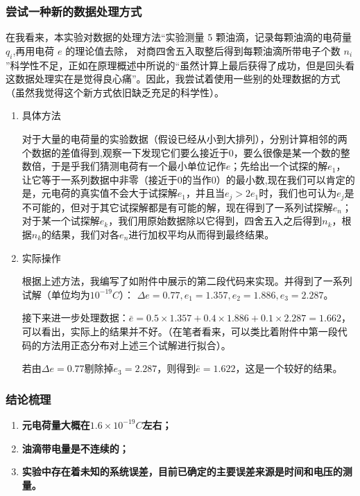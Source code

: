 \documentclass[dvipsnames, svgnames,a4paper,11pt]{article}
\begin{document}
	\subsubsection{尝试一种新的数据处理方式}
	在我看来，本实验对数据的处理方法“实验测量 5 颗油滴，记录每颗油滴的电荷量 $q_i$,再用电荷 $e$ 的理论值去除，
	对商四舍五入取整后得到每颗油滴所带电子个数 $n_i$”科学性不足，正如在原理概述中所说的“虽然计算上最后获得了成功，但是回头看这数据处理实在是觉得良心痛”。因此，我尝试着使用一些别的处理数据的方式（虽然我觉得这个新方式依旧缺乏充足的科学性）。
	\begin{enumerate}
		\item 具体方法
		
		对于大量的电荷量的实验数据（假设已经从小到大排列），分别计算相邻的两个数据的差值得到,观察一下发现它们要么接近于0，要么很像是某一个数的整数倍，于是乎我们猜测电荷有一个最小单位记作$e$；先给出一个试探的解$e_1$，让它等于一系列数据中非零（接近于0的当作0）的最小数,现在我们可以肯定的是，元电荷的真实值不会大于试探解$e_1$，并且当$e_j>2e_1$时，我们也可认为$e_j$是不可能的，但对于其它试探解都是有可能的解，现在得到了一系列试探解${e_n}$；对于某一个试探解$e_k$，我们用原始数据除以它得到，四舍五入之后得到$n_k$，根据$n_k$的结果，我们对各${e_n}$进行加权平均从而得到最终结果。
		
		\item 实际操作
		
		根据上述方法，我编写了如附件中展示的第二段代码来实现。并得到了一系列试解（单位均为$10^{-19}C$）：
		$\Delta e=0.77, e_1=1.357, e_2=1.886, e_3= 2.287$。
		
		接下来进一步处理数据：$\bar{e}=0.5\times1.357+0.4\times1.886+0.1\times2.287=1.662$，可以看出，实际上的结果并不好。（在笔者看来，可以类比着附件中第一段代码的方法用正态分布对上述三个试解进行拟合）。
		
		若由$\Delta e=0.77$剔除掉$e_3= 2.287$，则得到$\bar{e}=1.622$，这是一个较好的结果。
	\end{enumerate}
	
	\subsubsection{结论梳理}
	\begin{enumerate}
		\item \textbf{元电荷量大概在$1.6\times10^{-19}C$左右；}
		\item \textbf{油滴带电量是不连续的；}
		\item \textbf{实验中存在着未知的系统误差，目前已确定的主要误差来源是时间和电压的测量。}
	\end{enumerate}
	
\end{document}

